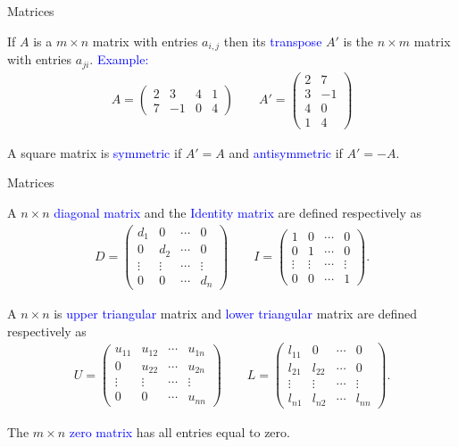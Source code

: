 \documentclass[11pt,aspectratio=169]{beamer}
\begin{document}
\begin{frame}{Matrices}


If $A$ is a $m \times n$ matrix with entries $a_{i,j}$ then its \textcolor{blue}{transpose} $A'$ is the $n\times m$ matrix with entries $a_{ji}$.
\vskip 12pt
\textcolor{blue}{Example:}
\begin{align*}A=\begin{pmatrix}2& 3 & 4 & 1\\
7 & -1 & 0 & 4
\end{pmatrix} \qquad 
A'=\begin{pmatrix}2& 7\\
3 & -1 \\
4 & 0 \\
1& 4
\end{pmatrix}
\end{align*}

A square matrix is \textcolor{blue}{symmetric} if $A'=A$ and \textcolor{blue}{antisymmetric} if $A'=-A$. 
\end{frame}


\begin{frame}{Matrices}

 A $n \times n$ \textcolor{blue}{diagonal matrix} and the \textcolor{blue}{Identity matrix} are defined respectively as
\begin{align*}D=\begin{pmatrix} d_1 & 0 & \cdots &0\\
0 & d_2 & \cdots &0 \\
\vdots & \vdots & \cdots &\vdots \\
0 &0 & \cdots &d_n
\end{pmatrix} \qquad I=\begin{pmatrix}1 & 0 & \cdots &0\\
0 & 1 & \cdots &0 \\
\vdots & \vdots & \cdots &\vdots \\
0 &0 & \cdots &1
\end{pmatrix}.
\end{align*}

 A $n \times n$ is \textcolor{blue}{upper triangular} matrix and \textcolor{blue}{lower triangular} matrix are defined respectively as
\begin{align*}U=\begin{pmatrix} u_{11} & u_{12} & \cdots &u_{1n}\\
0 & u_{22} & \cdots &u_{2n} \\
\vdots & \vdots & \cdots &\vdots \\
0 &0 & \cdots &u_{nn}
\end{pmatrix} \qquad L=\begin{pmatrix}l_{11} & 0 & \cdots &0\\
l_{21} & l_{22} & \cdots &0 \\
\vdots & \vdots & \cdots &\vdots \\
l_{n1} &l_{n2} & \cdots &l_{nn}
\end{pmatrix}.
\end{align*}

The $m \times n$ \textcolor{blue}{zero matrix} has all entries equal to zero. \end{frame}
\end{document}
